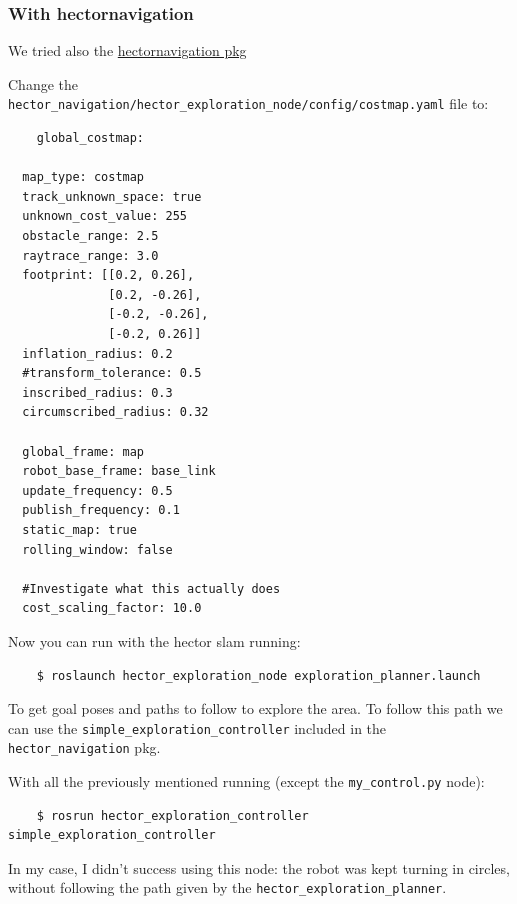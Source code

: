 \documentclass{article}
\begin{document}
\subsubsection{With hector\textunderscore navigation}
We tried also the \href{https://github.com/tu-darmstadt-ros-pkg/hector_navigation/tree/noetic-devel}{hector\textunderscore navigation pkg} 

Change the \verb|hector_navigation/hector_exploration_node/config/costmap.yaml| file to:

\begin{verbatim}
    global_costmap:

  map_type: costmap
  track_unknown_space: true
  unknown_cost_value: 255
  obstacle_range: 2.5
  raytrace_range: 3.0
  footprint: [[0.2, 0.26],
              [0.2, -0.26],
              [-0.2, -0.26],
              [-0.2, 0.26]]
  inflation_radius: 0.2
  #transform_tolerance: 0.5
  inscribed_radius: 0.3
  circumscribed_radius: 0.32

  global_frame: map
  robot_base_frame: base_link
  update_frequency: 0.5
  publish_frequency: 0.1
  static_map: true
  rolling_window: false

  #Investigate what this actually does
  cost_scaling_factor: 10.0

\end{verbatim}

Now you can run with the hector slam running:
\begin{verbatim}
    $ roslaunch hector_exploration_node exploration_planner.launch 
\end{verbatim}

To get goal poses and paths to follow to explore the area. To follow this path we can use the \verb|simple_exploration_controller| included in the \verb|hector_navigation| pkg.

With all the previously mentioned running (except the \verb|my_control.py| node):

\begin{verbatim}
    $ rosrun hector_exploration_controller simple_exploration_controller
\end{verbatim}

In my case, I didn't success using this node: the robot was kept turning in circles, without following the path given by the \verb|hector_exploration_planner|.
\end{document}
